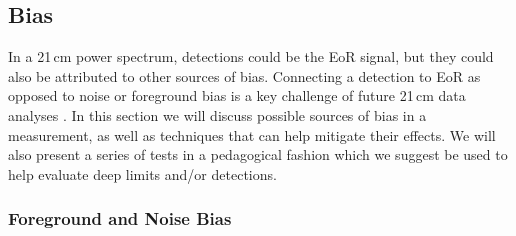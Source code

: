 \documentclass[preprint2,numberedappendix,tighten]{aastex6}
\begin{document}


\subsection{Bias}
\label{sec:BiasOverview}

In a 21\,cm power spectrum, detections could be the EoR signal, but they could also 
be attributed to other sources of bias. Connecting a detection to EoR as opposed to noise or foreground bias is a key challenge of 
future 21\,cm data analyses \citep[e.g.][]{petrovic_and_oh2011}. In this section we will discuss possible sources of bias in a measurement, as well as techniques 
that can help mitigate their effects. We will also present a series of tests in a pedagogical fashion which we suggest be used to 
help evaluate deep limits and/or detections.

\subsubsection{Foreground and Noise Bias}
\label{sec:BiasTypes}
\end{document}
